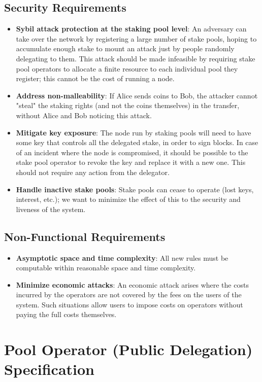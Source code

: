 \subsection{Security Requirements}
\begin{itemize}
    \item \textbf{Sybil attack protection at the staking pool level}: An adversary can take over the network by registering a large number of stake pools, hoping to accumulate enough stake to mount an attack just by people randomly delegating to them. This attack should be made infeasible by requiring stake pool operators to allocate a finite resource to each individual pool they register; this cannot be the cost of running a node.
    \item \textbf{Address non-malleability}: If Alice sends coins to Bob, the attacker cannot "steal" the staking rights (and not the coins themselves) in the transfer, without Alice and Bob noticing this attack.  
    \item \textbf{Mitigate key exposure}: The node run by staking pools will need to have some key that controls all the delegated stake, in order to sign blocks. In case of an incident where the node is compromised, it should be possible to the stake pool operator to revoke the key and replace it with a new one. This should not require any action from the delegator. 
    \item \textbf{Handle inactive stake pools}: Stake pools can cease to operate (lost keys, interest, etc.); we want to minimize the effect of this to the security and liveness of the system. 
\end{itemize}
\subsection{Non-Functional Requirements}
\begin{itemize}
    \item \textbf{Asymptotic space and time complexity}: All new rules must be computable within reasonable space and time complexity. 
    \item \textbf{Minimize economic attacks}: An economic attack arises where the costs incurred by the operators are not covered by the fees on the users of the system. Such situations allow users to impose costs on operators without paying the full costs themselves. 
\end{itemize}

\section{Pool Operator (Public Delegation) Specification}

